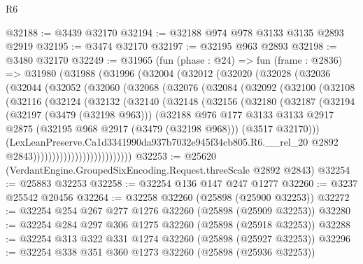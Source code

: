 \begin{lexlean}{R6}
\begin{coremodule}
@32188 := @3439 @32170
@32194 := @32188 @974 @978 @3133 @3135 @2893 @2919
@32195 := @3474 @32170
@32197 := @32195 @963 @2893
@32198 := @3480 @32170
@32249 := @31965
    (fun (phase : @24) =>
    fun (frame : @2836) =>
    @31980
      (@31988
        (@31996
          (@32004
            (@32012
              (@32020
                (@32028
                  (@32036
                    (@32044
                      (@32052
                        (@32060
                          (@32068
                            (@32076
                              (@32084
                                (@32092
                                  (@32100
                                    (@32108
                                      (@32116
                                        (@32124
                                          (@32132
                                            (@32140
                                              (@32148
                                                (@32156
                                                  (@32180
                                                    (@32187
                                                      (@32194
                                                        (@32197 (@3479 (@32198 @963)))
                                                        (@32188
                                                          @976
                                                          @177
                                                          @3133
                                                          @3133
                                                          @2917
                                                          @2875
                                                          (@32195 @968 @2917 (@3479 (@32198 @968)))
                                                          (@3517 @32170)))
                                                      (LexLeanPreserve.Ca1d3341990da937b7032e945f34cb805.R6.__rel_20
                                                        @2892
                                                        @2843))))))))))))))))))))))))))
@32253 := @25620 (VerdantEngine.GroupedSixEncoding.Request.threeScale @2892 @2843)
@32254 := @25883 @32253
@32258 := @32254 @136 @147 @247 @1277
@32260 := @3237 @25542 @20456
@32264 := @32258 @32260 (@25898 (@25900 @32253))
@32272 := @32254 @254 @267 @277 @1276 @32260 (@25898 (@25909 @32253))
@32280 := @32254 @284 @297 @306 @1275 @32260 (@25898 (@25918 @32253))
@32288 := @32254 @313 @322 @331 @1274 @32260 (@25898 (@25927 @32253))
@32296 := @32254 @338 @351 @360 @1273 @32260 (@25898 (@25936 @32253))

\end{coremodule}
\end{lexlean}
